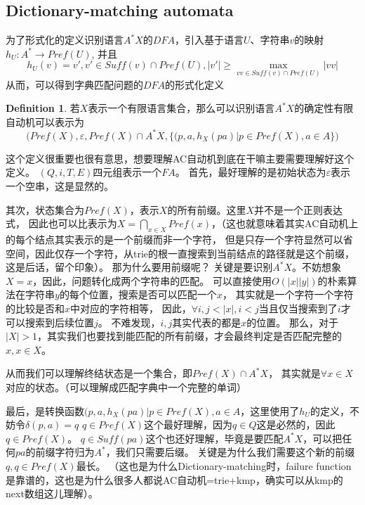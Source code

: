 \documentclass[UTF8]{ctexart}
\theoremstyle{definition}
\newtheorem{defn}[thm]{Definition}
\theoremstyle{remark}
\numberwithin{equation}{subsection}
\newcommand{\Suff}{\textit{Suff}}
\begin{document}
\subsection{Dictionary-matching automata}
	
	为了形式化的定义识别语言$A^*X$的$DFA$，引入基于语言$U$、字符串$v$的映射$h_U: A^* \rightarrow Pref(U) $, 并且
	\[
		h_U(v) = v', v' \in \Suff(v) \cap Pref(U), |v'| \ge \max_{vv \in \Suff(v)\cap Pref(U)} {|vv|}
	\]
	从而，可以得到字典匹配问题的$DFA$的形式化定义
	\begin{defn}
		若$X$表示一个有限语言集合，那么可以识别语言$A^*X$的确定性有限自动机可以表示为
		\[
			\Big( Pref(X), \varepsilon, Pref(X) \cap A^*X, \{(p,a,h_X(pa) | p \in Pref(X), a \in A\} \Big)
		\]
	\end{defn}
	这个定义很重要也很有意思，想要理解AC自动机到底在干嘛主要需要理解好这个定义。
	$(Q, i, T, E)$四元组表示一个$FA$。
	首先，最好理解的是初始状态为$\varepsilon$表示一个空串，这是显然的。
	
	其次，状态集合为$Pref(X)$，表示$X$的所有前缀。这里$X$并不是一个正则表达式，
	因此也可以比表示为$X = \bigcap_{x \in X} Pref(x)$，（这也就意味着其实AC自动机上的每个结点其实表示的是一个前缀而非一个字符，
	但是只存一个字符显然可以省空间，因此仅存一个字符，从trie的根一直搜索到当前结点的路径就是这个前缀，这是后话，留个印象）。
	那为什么要用前缀呢？
	关键是要识别$A^*X$。不妨想象$X={x}$，因此，问题转化成两个字符串的匹配。
	可以直接使用$O(|x||y|)$的朴素算法在字符串$y$的每个位置，搜索是否可以匹配一个$x$，
	其实就是一个字符一个字符的比较是否和$x$中对应的字符相等，
	因此，$\forall i,j < |x|, i<j$当且仅当搜索到了$i$才可以搜索到后续位置$j$。
	不难发现，$i,j$其实代表的都是$x$的位置。
	那么，对于$|X|>1$，其实我们也要找到能匹配的所有前缀，才会最终判定是否匹配完整的$x, x \in X$。
	
	从而我们可以理解终结状态是一个集合，即$Pref(X) \cap A^*X$，
	其实就是$\forall x \in X$对应的状态。（可以理解成匹配字典中一个完整的单词）
	
	最后，是转换函数${(p,a,h_X(pa) | p \in Pref(X), a \in A}$，这里使用了$h_U$的定义，不妨令$\delta(p,a)=q$
	$q \in Pref(X)$这个最好理解，因为$q \in Q$这是必然的，因此$q \in Pref(X)$。
	$q \in \Suff(pa)$这个也还好理解，毕竟是要匹配$A^*X$，可以把任何$pa$的前缀字符归为$A^*$，我们只需要后缀。
	关键是为什么我们需要这个新的前缀$q, q \in Pref(X)$最长。
	（这也是为什么Dictionary-matching时，failure function是靠谱的，这也是为什么很多人都说AC自动机=trie+kmp，确实可以从kmp的next数组这儿理解）。
	
\end{document}
